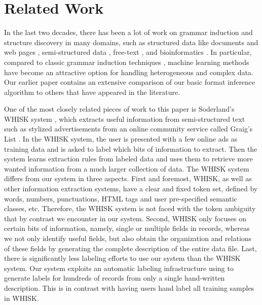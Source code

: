 \section{Related Work}\label{sec:related}

In the last two decades, there has been a lot of work on
grammar induction and structure discovery in many domains,
such as structured data like \xml{} documents
\cite{bex+:dtd-inference,garofalakis+:xtract} and web pages
\cite{kushmerick-phd1997,arasu+:sigmod03,hong:thesis}, semi-structured data
\cite{soderland:whisk,Pinto+:texttables}, free-text 
\cite{borkar+:text-segmentation,Heeman99:speech,Chen95bayesiangrammar}, and
bioinformatics \cite{kulp96generalized}. In particular, compared to classic 
grammar induction techniques
\cite{vidal:gisurvey,gold:inference,angluin:revesible-language-inference},
machine learning methods have become an attractive option for handling
heterogeneous and complex data. Our earlier paper \cite{fisher+:dirttoshovels}
contains an extensive comparison of our basic format inference
algorithm to others that have appeared in the literature.

One of the most closely related pieces of work to this paper is Soderland's WHISK
system \cite{soderland:whisk}, which extracts useful information from
semi-structured text such as stylized advertisements from an online community
service called Graig's List \cite{craigslist}.
In the WHISK system, the user is presented with a few online ads as training data 
and is asked to label which bits of information to extract. Then the system learns
extraction rules from labeled data and uses them to retrieve more wanted
information from a much larger collection of data. 
The WHISK system differs from our system in three aspects. 
First and foremost, WHISK, as well as other information extraction systems,
have a clear and fixed token set, defined by words, numbers, punctuations, 
HTML tags and user pre-specified semantic classes, etc. 
Therefore, the WHISK system is not faced with the token ambiguity that 
by contrast we encounter in our system. Second, WHISK only focuses on certain bits of
information, namely, single or multiple fields in records, 
whereas we not only identify useful fields, but also obtain the 
organization and relations of these fields by generating the complete 
description of the entire data file. 
Last, there is significantly less labeling efforts to use our system than 
the WHISK system. Our system exploits an automatic labeling 
infrastructure using \pads{} to generate
labels for hundreds of records from only a single hand-written description.
This is in contrast with having users hand label all training samples
in WHISK.

